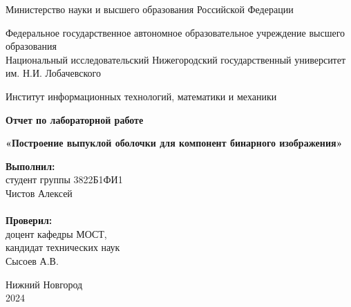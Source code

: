 \documentclass{report}
\begin{document}
\begin{titlepage}

\begin{center}
Министерство науки и высшего образования Российской Федерации
\end{center}

\begin{center}
Федеральное государственное автономное образовательное учреждение высшего образования \\
Национальный исследовательский Нижегородский государственный университет им. Н.И. Лобачевского
\end{center}

\begin{center}
Институт информационных технологий, математики и механики
\end{center}

\vspace{4em}

\begin{center}
\textbf{\Large Отчет по лабораторной работе} \\
\end{center}
\begin{center}
\textbf{\Large «Построение выпуклой оболочки для компонент бинарного изображения»} \\
\end{center}

\vspace{4em}

\newbox{\lbox}
\newlength{\maxl}
\setlength{\maxl}{\wd\lbox}
\hfill\parbox{7cm}{
\hspace*{5cm}\hspace*{-5cm}\textbf{Выполнил:} \\ студент группы 3822Б1ФИ1 \\ Чистов Алексей\\
\\
\hspace*{5cm}\hspace*{-5cm}\textbf{Проверил:}\\ доцент кафедры МОСТ, \\ кандидат технических наук \\ Сысоев А.В.\\}
\vspace{\fill}

\begin{center} Нижний Новгород \\ 2024 \end{center}

\end{titlepage}
\end{document}
